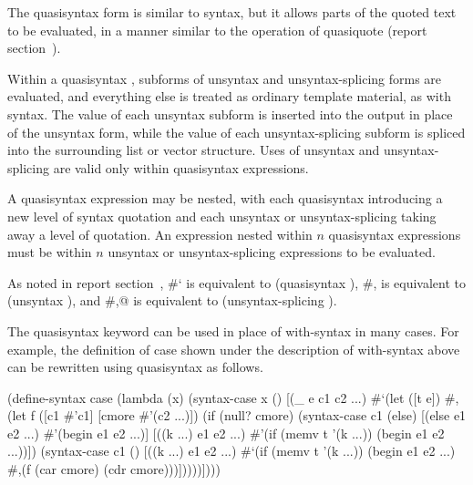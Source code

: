 \begin{entry}{%
}

The {\cf quasisyntax} form is similar to {\cf syntax}, but it allows parts
of the quoted text to be evaluated, in a manner similar to the operation
of {\cf quasiquote} (report section~).

Within a {\cf quasisyntax} , subforms of
{\cf unsyntax} and {\cf unsyntax-splicing} forms are evaluated,
and everything else is treated as ordinary template material, as
with {\cf syntax}.
The value of each {\cf unsyntax} subform is inserted into the output
in place of the {\cf unsyntax} form, while the value of each
{\cf unsyntax-splicing} subform is spliced into the surrounding list
or vector structure.
Uses of {\cf unsyntax} and {\cf unsyntax-splicing} are valid only within
{\cf quasisyntax} expressions.

A {\cf quasisyntax} expression may be nested, with each {\cf quasisyntax}
introducing a new level of syntax quotation and each {\cf unsyntax} or
{\cf unsyntax-splicing} taking away a level of quotation.
An expression nested within $n$ {\cf quasisyntax} expressions must
be within $n$ {\cf unsyntax} or {\cf unsyntax-splicing} expressions to
be evaluated.

As noted in report section~,
{\cf \#`} is equivalent to {\cf (quasisyntax
  )}, {\cf \#,} is equivalent to {\cf (unsyntax
  )}, and {\cf \#,@} is equivalent to {\cf (unsyntax-splicing
  )}.

The {\cf quasisyntax} keyword can be used in place of {\cf with-syntax} in many
cases.
For example, the definition of {\cf case} shown under the description
of {\cf with-syntax} above can be rewritten using {\cf quasisyntax}
as follows.

\begin{schemenoindent}
(define-syntax case
  (lambda (x)
    (syntax-case x ()
      [(\_ e c1 c2 ...)
       \#`(let ([t e])
           \#,(let f ([c1 \#'c1] [cmore \#'(c2 ...)])
               (if (null? cmore)
                   (syntax-case c1 (else)
                     [(else e1 e2 ...)
                      \#'(begin e1 e2 ...)]
                     [((k ...) e1 e2 ...)
                      \#'(if (memv t '(k ...))
                            (begin e1 e2 ...))])
                   (syntax-case c1 ()
                     [((k ...) e1 e2 ...)
                      \#`(if (memv t '(k ...))
                            (begin e1 e2 ...)
                            \#,(f (car cmore)
                                  (cdr cmore)))]))))])))%
\end{schemenoindent}
                          

\end{entry}
